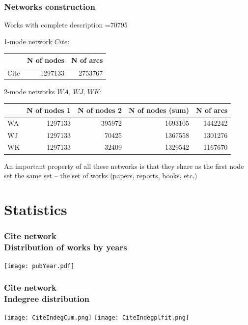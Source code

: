 \documentclass[hyperref={pdfstartview={FitBH -32768},
                         pdfpagemode=FullScreen,
                         plainpages=false,
                         colorlinks=true}
              ]{beamer}
\begin{document}
\begin{frame}[fragile]
\frametitle{Networks construction}
\small 

Works with complete description =70795 \medskip

1-mode network $Cite$: \medskip

\begin{center}
\begin{tabular}{l|r|r|}
 	& N of nodes & N of arcs \\ \hline		
Cite	& 1297133	& 2753767	\\ \hline
\end{tabular}
\end{center}
\bigskip

2-mode networks $WA$, $WJ$, $WK$:  \medskip 

\begin{tabular}{l|r|r|r|r|}
	& N of nodes 1	& N of nodes 2	& N of nodes (sum)	& N of arcs \\ \hline		 
WA	& 1297133	          & 395972	          & 1693105	           & 1442242 \\ 
WJ	& 1297133	          & 70425	          & 1367558	           & 1301276 \\ 
WK 	& 1297133	          & 32409	          & 1329542	           & 1167670 \\  \hline 
\end{tabular}\bigskip				

An important property of all these networks is that they share as the first node set the same set – the set of works (papers, reports, books, etc.) 

\end{frame}

\section{Statistics}


\begin{frame}[fragile]
\frametitle{Cite network\label{maxin}\\ \normalsize Distribution of works by years}
\begin{center}
\texttt{[image: pubYear.pdf]}
\end{center}
\end{frame}


\begin{frame}[fragile]
\frametitle{Cite network\label{maxin}\\ \normalsize Indegree distribution}

\begin{center}
\texttt{[image: CiteIndegCum.png]}
\texttt{[image: CiteIndegplfit.png]}
\end{center}

\end{frame}
\end{document}
